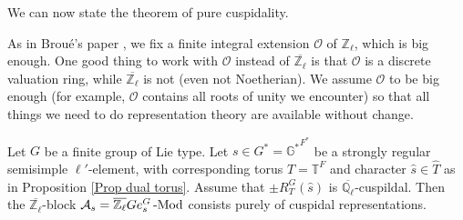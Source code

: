 	We can now state the theorem of pure cuspidality. 
	
	As in Broué's paper \cite{broue1990isometries}, we fix a finite integral extension $\mathcal{O}$ of $\mathbb{Z}_{\ell}$, which is big enough. One good thing to work with $\mathcal{O}$ instead of $\overline{\mathbb{Z}_{\ell}}$ is that $\mathcal{O}$ is a discrete valuation ring, while $\overline{\mathbb{Z}_{\ell}}$ is not (even not Noetherian). We assume $\mathcal{O}$ to be big enough (for example, $\mathcal{O}$ contains all roots of unity we encounter) so that all things we need to do representation theory are available without change.
	
	\begin{theorem}\label{Theorem Pure Cuspidality}
		Let $G$ be a finite group of Lie type. Let $s \in G^*=\mathbb{G^*}^{F^*}$ be a strongly regular semisimple $\ell'$-element, with corresponding torus $T=\mathbb{T}^F$ and character $\hat{s} \in \hat{T}$ as in Proposition \ref{Prop dual torus}. Assume that $\pm R_T^G(\hat{s})$ is $\overline{\mathbb{Q}_{\ell}}$-cuspildal. Then the $\overline{\mathbb{Z}_{\ell}}$-block $\mathcal{A}_s=\overline{\mathbb{Z}_{\ell}}Ge_s^G\operatorname{-Mod}$ consists purely of cuspidal representations.
	\end{theorem}
	
